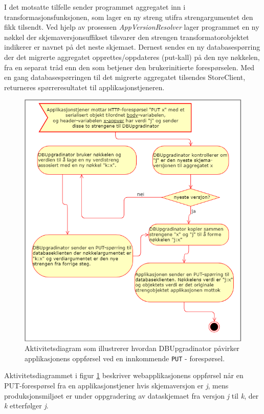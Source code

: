 I det motsatte tilfelle sender programmet aggregatet inn i transformasjonsfunksjonen, som lager en ny streng utifra strengargumentet den fikk tilsendt. Ved hjelp av prosessen \emph{AppVersionResolver} lager programmet en ny nøkkel der skjemaversjon\-suffikset tilsvarer den strengen transformatorobjektet indikerer er navnet på det neste skjemaet. Dernest sendes en ny databasespørring der det migrerte aggregatet opprettes/oppdateres (put-kall) på den nye nøkkelen, fra en separat tråd enn den som betjener den brukerinitierte forespørselen. Med en gang databasespørringen til det migrerte aggregatet tilsendes StoreClient, returneres spørreresultatet til applikasjonstjeneren.

\begin{figure}[hbtp]
  \centering
  \includegraphics[scale=0.6]{fig/dbupgradinator-prosess-3.png}
  \caption{Aktivitetsdiagram som illustrerer hvordan DBUpgradinator påvirker applikasjonens oppførsel ved en innkommende \texttt{PUT} - forespørsel.}
  \label{fig9}
\end{figure}

Aktivitetsdiagrammet i figur \ref{fig9} beskriver webapplikasjonens oppførsel når en PUT-forespørsel fra en applikasjonstjener hvis skjemaversjon er \emph{j}, mens produksjonsmiljøet er under oppgradering av dataskjemaet fra versjon \emph{j} til \emph{k}, der \emph{k} etterfølger \emph{j}.

